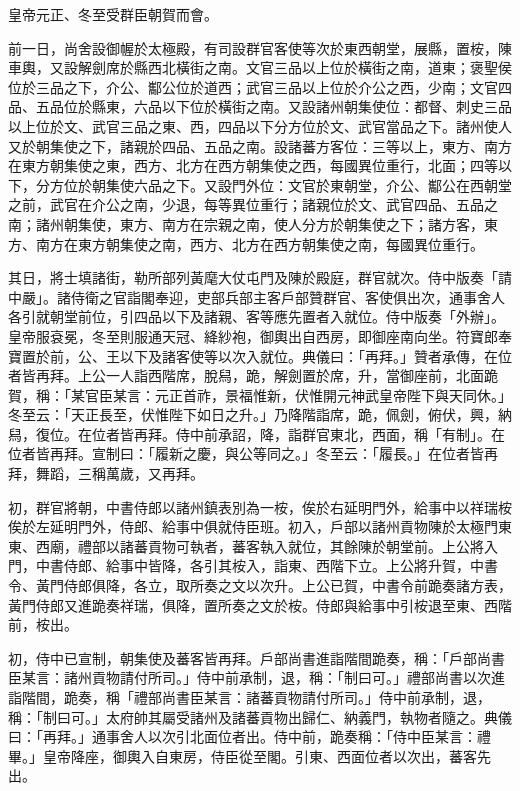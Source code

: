 
\begin{pinyinscope}

 皇帝元正、冬至受群臣朝賀而會。



 前一日，尚舍設御幄於太極殿，有司設群官客使等次於東西朝堂，展縣，置桉，陳車輿，又設解劍席於縣西北橫街之南。文官三品以上位於橫街之南，道東；褒聖侯位於三品之下，介公、酅公位於道西；武官三品以上位於介公之西，少南；文官四品、五品位於縣東，六品以下位於橫街之南。又設諸州朝集使位：都督、刺史三品以上位於文、武官三品之東、西，四品以下分方位於文、武官當品之下。諸州使人又於朝集使之下，諸親於四品、五品之南。設諸蕃方客位：三等以上，東方、南方在東方朝集使之東，西方、北方在西方朝集使之西，每國異位重行，北面；四等以下，分方位於朝集使六品之下。又設門外位：文官於東朝堂，介公、酅公在西朝堂之前，武官在介公之南，少退，每等異位重行；諸親位於文、武官四品、五品之南；諸州朝集使，東方、南方在宗親之南，使人分方於朝集使之下；諸方客，東方、南方在東方朝集使之南，西方、北方在西方朝集使之南，每國異位重行。



 其日，將士填諸街，勒所部列黃麾大仗屯門及陳於殿庭，群官就次。侍中版奏「請中嚴」。諸侍衛之官詣閣奉迎，吏部兵部主客戶部贊群官、客使俱出次，通事舍人各引就朝堂前位，引四品以下及諸親、客等應先置者入就位。侍中版奏「外辦」。皇帝服袞冕，冬至則服通天冠、絳紗袍，御輿出自西房，即御座南向坐。符寶郎奉寶置於前，公、王以下及諸客使等以次入就位。典儀曰：「再拜。」贊者承傳，在位者皆再拜。上公一人詣西階席，脫舄，跪，解劍置於席，升，當御座前，北面跪賀，稱：「某官臣某言：元正首祚，景福惟新，伏惟開元神武皇帝陛下與天同休。」冬至云：「天正長至，伏惟陛下如日之升。」乃降階詣席，跪，佩劍，俯伏，興，納舄，復位。在位者皆再拜。侍中前承詔，降，詣群官東北，西面，稱「有制」。在位者皆再拜。宣制曰：「履新之慶，與公等同之。」冬至云：「履長。」在位者皆再拜，舞蹈，三稱萬歲，又再拜。



 初，群官將朝，中書侍郎以諸州鎮表別為一桉，俟於右延明門外，給事中以祥瑞桉俟於左延明門外，侍郎、給事中俱就侍臣班。初入，戶部以諸州貢物陳於太極門東東、西廟，禮部以諸蕃貢物可執者，蕃客執入就位，其餘陳於朝堂前。上公將入門，中書侍郎、給事中皆降，各引其桉入，詣東、西階下立。上公將升賀，中書令、黃門侍郎俱降，各立，取所奏之文以次升。上公已賀，中書令前跪奏諸方表，黃門侍郎又進跪奏祥瑞，俱降，置所奏之文於桉。侍郎與給事中引桉退至東、西階前，桉出。



 初，侍中已宣制，朝集使及蕃客皆再拜。戶部尚書進詣階間跪奏，稱：「戶部尚書臣某言：諸州貢物請付所司。」侍中前承制，退，稱：「制曰可。」禮部尚書以次進詣階間，跪奏，稱「禮部尚書臣某言：諸蕃貢物請付所司。」侍中前承制，退，稱：「制曰可。」太府帥其屬受諸州及諸蕃貢物出歸仁、納義門，執物者隨之。典儀曰：「再拜。」通事舍人以次引北面位者出。侍中前，跪奏稱：「侍中臣某言：禮畢。」皇帝降座，御輿入自東房，侍臣從至閣。引東、西面位者以次出，蕃客先出。




\end{pinyinscope}
